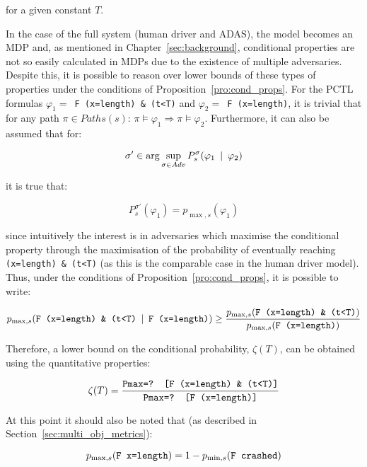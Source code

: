 for a given constant $T$.

In the case of the full system (human driver and ADAS), the model becomes an MDP and, as mentioned in Chapter~\ref{sec:background}, conditional properties are not so easily calculated in MDPs due to the existence of multiple adversaries. Despite this, it is possible to reason over lower bounds of these types of properties under the conditions of Proposition~\ref{pro:cond_props}. For the PCTL formulas $\varphi_1 = $\texttt{ F (x=length) \& (t<T)} and $\varphi_2 = $\texttt{ F (x=length)}, it is trivial that for any path $\pi \in Paths(s)$: $\pi \models \varphi_1 \Rightarrow \pi \models \varphi_2$. Furthermore, it can also be assumed that for:

\begin{equation}
	\sigma' \in \arg\sup_{\sigma \in Adv} P^{\sigma}_s (\varphi_1 \:\mid\: \varphi_2)
\end{equation}

it is true that:

\begin{equation}
	P^{\sigma'}_s (\varphi_1) = p_{\max, s} (\varphi_1)
\end{equation}

since intuitively the interest is in adversaries which maximise the conditional property through the maximisation of the probability of eventually reaching \texttt{(x=length) \& (t<T)} (as this is the comparable case in the human driver model). Thus, under the conditions of Proposition~\ref{pro:cond_props}, it is possible to write:

\begin{equation}
	p_{\max, s} (\text{\texttt{F (x=length) \& (t<T)}} \:\mid\: \text{\texttt{F (x=length)}}) \geq \frac{p_{\max, s} (\text{\texttt{F (x=length) \& (t<T)}})}{p_{\max, s} (\text{\texttt{F (x=length)}})}
\end{equation}

Therefore, a lower bound on the conditional probability, $\zeta(T)$, can be obtained using the quantitative properties:

\begin{equation}
	\zeta(T) = \frac{\text{\texttt{Pmax=? [F (x=length) \& (t<T)]}}}{\text{\texttt{Pmax=? [F (x=length)]}}}
\end{equation}

At this point it should also be noted that (as described in Section~\ref{sec:multi_obj_metrics}):

\begin{equation}
	p_{\max,s} (\text{\texttt{F x=length}}) = 1 - p_{\min,s} (\text{\texttt{F crashed}})
\end{equation}

